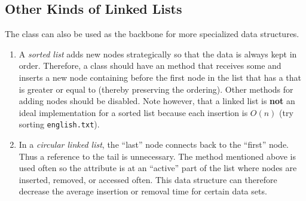 \subsection*{Other Kinds of Linked Lists} %

The  class can also be used as the backbone for more specialized data structures.
%
\begin{enumerate}
\item A \emph{sorted list} adds new nodes strategically so that the data is always kept in order.
Therefore, a  class should have an  method that receives some  and inserts a new node containing  before the first node in the list that has a  that is greater or equal to  (thereby preserving the ordering).
Other methods for adding nodes should be disabled.
Note however, that a linked list is \textbf{not} an ideal implementation for a sorted list because each insertion is $O(n)$ (try sorting \texttt{english.txt}).

\item In a \emph{circular linked list}, the ``last'' node connects back to the ``first'' node.
Thus a reference to the tail is unnecessary.
The  method mentioned above is used often so the  attribute is at an ``active'' part of the list where nodes are inserted, removed, or accessed often.
This data structure can therefore decrease the average insertion or removal time for certain data sets. %
\end{enumerate}
